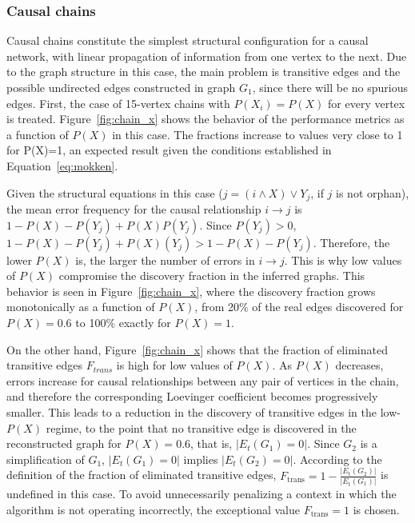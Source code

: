 \documentclass[12pt,a4paper]{report}
\begin{document}
\subsubsection{Causal chains}
Causal chains constitute the simplest structural configuration for a causal network, with linear propagation of information from one vertex to the next. Due to the graph structure in this case, the main problem is transitive edges and the possible undirected edges constructed in graph $G_1$, since there will be no spurious edges. First, the case of 15-vertex chains with $P(X_i) = P(X)$ for every vertex is treated. Figure~\ref{fig:chain_x} shows the behavior of the performance metrics as a function of $P(X)$ in this case. The fractions increase to values very close to 1 for P(X)=1, an expected result given the conditions established in Equation~\ref{eq:mokken}.

Given the structural equations in this case ($j=(i \land X) \lor Y_j$, if $j$ is not orphan), the mean error frequency for the causal relationship $i \to j$ is $1 - P(X) - P(Y_j) + P(X)P(Y_j)$. Since $P(Y_j) > 0$, $1 - P(X) - P(Y_j) + P(X)(Y_j) > 1 - P(X) - P(Y_j)$. Therefore, the lower $P(X)$ is, the larger the number of errors in $i \to j$. This is why low values of $P(X)$ compromise the discovery fraction in the inferred graphs. This behavior is seen in Figure~\ref{fig:chain_x}, where the discovery fraction grows monotonically as a function of $P(X)$, from 20$\%$ of the real edges discovered for $P(X)=0.6$ to 100$\%$ exactly for $P(X)=1$. 

On the other hand, Figure~\ref{fig:chain_x} shows that the fraction of eliminated transitive edges $F_{trans}$ is high for low values of $P(X)$. As $P(X)$ decreases, errors increase for causal relationships between any pair of vertices in the chain, and therefore the corresponding Loevinger coefficient becomes progressively smaller. This leads to a reduction in the discovery of transitive edges in the low-$P(X)$ regime, to the point that no transitive edge is discovered in the reconstructed graph for $P(X)=0.6$, that is, $|E_t(G_1)=0|$. Since $G_2$ is a simplification of $G_1$, $|E_t(G_1)=0|$ implies $|E_t(G_2)=0|$. According to the definition of the fraction of eliminated transitive edges, $F_{\text{trans}} = 1 - \frac{|E_{\text{t}}(G_2)|}{|E_{\text{t}}(G_1)|}$ is undefined in this case. To avoid unnecessarily penalizing a context in which the algorithm is not operating incorrectly, the exceptional value $F_{\text{trans}} = 1$ is chosen. 
\end{document}
